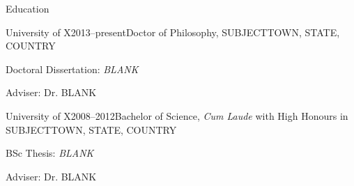 \documentclass{resume} %
\begin{document}
\ifresume %
\else %
    \pointskip 
\fi


\begin{rSection}{Education}

\begin{rSubsection}{University of X}{2013--present}{Doctor of Philosophy, SUBJECT}{TOWN, STATE, COUNTRY}
    \item Doctoral Dissertation: \emph{BLANK}
    \item Adviser: Dr. BLANK
\end{rSubsection}

\ifresume %
\else %
    \smallskip
\fi


\begin{rSubsection}{University of X}{2008--2012}{Bachelor of Science, \emph{Cum Laude} with High Honours in SUBJECT}{TOWN, STATE, COUNTRY}
    \item BSc Thesis: \emph{BLANK}
    \item Adviser: Dr. BLANK
\end{rSubsection}

\end{rSection}
\end{document}
